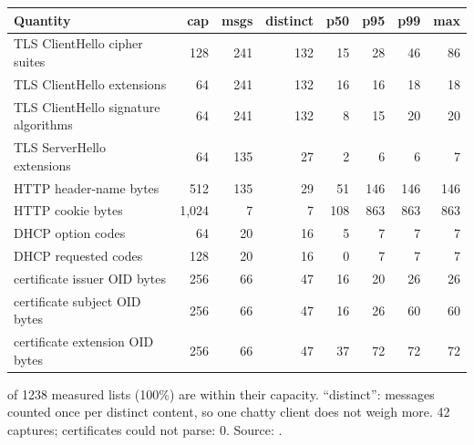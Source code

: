 \begin{tabularx}{\textwidth}{X r r r r r r r}
\toprule
\textbf{Quantity} & \textbf{cap} & \textbf{msgs} & \textbf{distinct} & \textbf{p50} & \textbf{p95} & \textbf{p99} & \textbf{max} \\
\midrule
TLS ClientHello cipher suites & 128 & 241 & 132 & 15 & 28 & 46 & 86 \\
TLS ClientHello extensions & 64 & 241 & 132 & 16 & 16 & 18 & 18 \\
TLS ClientHello signature algorithms & 64 & 241 & 132 & 8 & 15 & 20 & 20 \\
TLS ServerHello extensions & 64 & 135 & 27 & 2 & 6 & 6 & 7 \\
HTTP header-name bytes & 512 & 135 & 29 & 51 & 146 & 146 & 146 \\
HTTP cookie bytes & 1,024 & 7 & 7 & 108 & 863 & 863 & 863 \\
DHCP option codes & 64 & 20 & 16 & 5 & 7 & 7 & 7 \\
DHCP requested codes & 128 & 20 & 16 & 0 & 7 & 7 & 7 \\
certificate issuer OID bytes & 256 & 66 & 47 & 16 & 20 & 26 & 26 \\
certificate subject OID bytes & 256 & 66 & 47 & 16 & 26 & 60 & 60 \\
certificate extension OID bytes & 256 & 66 & 47 & 37 & 72 & 72 & 72 \\
\bottomrule
\end{tabularx}

 of 1238 measured lists (100\%) are within their capacity. ``distinct'': messages counted once per distinct content, so one chatty client does not weigh more. 42 captures; certificates  could not parse: 0. Source: .
